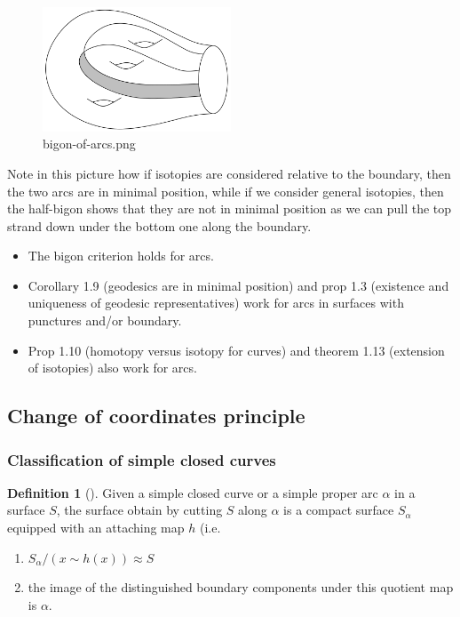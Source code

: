 \documentclass[reqno]{amsart}
\theoremstyle{definition}
\newtheorem{definition}[theorem]{Definition}
\theoremstyle{remark}
\begin{document}
\begin{figure}[htpb]
    \centering
    \includegraphics[width=0.5\textwidth]{bigon-of-arcs.png}
    \caption{bigon-of-arcs.png}
    \label{fig:bigon-of-arcs-png}
\end{figure}
Note in this picture how if isotopies are considered relative
to the boundary, then the two arcs are in minimal position, while
if we consider general isotopies, then the half-bigon shows that
they are not in minimal position as we can pull the top strand down
under the bottom one along the boundary.

\begin{itemize}
    \item The bigon criterion holds for arcs.
    \item Corollary 1.9 (geodesics are in minimal position)
        and prop 1.3 (existence and uniqueness of geodesic 
        representatives) work for arcs in surfaces with
        punctures and/or boundary.
    \item Prop 1.10 (homotopy versus isotopy for curves) and
        theorem 1.13 (extension of isotopies) also
        work for arcs.
\end{itemize}

\subsection*{Change of coordinates principle}

\subsubsection*{Classification of simple closed curves}

\begin{definition}[]
    Given a simple closed curve or
    a simple proper arc $\alpha$ in a surface $S$,
    the surface obtain by cutting $S$ along $\alpha$ is
    a compact surface $S_{\alpha}$ equipped with an attaching
    map $h$ (i.e.
    \begin{enumerate}
        \item $S_{\alpha} / \left( x \sim h(x) \right) 
            \approx S$ 
        \item the image of the distinguished boundary components
            under this quotient map is $\alpha$.
    \end{enumerate}
\end{definition}
\end{document}
